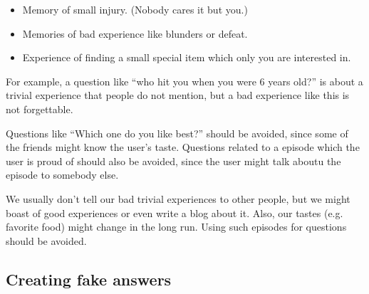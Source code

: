\documentclass{article}
\begin{document}
\begin{itemize}
\item Memory of small injury. (Nobody cares it but you.)

\item Memories of bad experience like blunders or defeat.

\item Experience of finding a small special item which only you are interested in.
\end{itemize}

For example, a question like
``who hit you when you were 6 years old?''
is about a trivial experience that people do not mention,
but a bad experience like this is not forgettable.

Questions like ``Which one do you like best?'' should be avoided,
since some of the friends might know the user's taste.
Questions related to a episode which the user is proud of should also be
avoided, since the user might talk aboutu the episode to somebody else.

We usually don't tell our bad trivial experiences to other people,
but we might boast of good experiences or even write a blog about it.
Also, our tastes (e.g. favorite food) might change in the long run.
Using such episodes for questions should be avoided.

% 
% 
% 
% 

\subsection{Creating fake answers}

\end{document}

